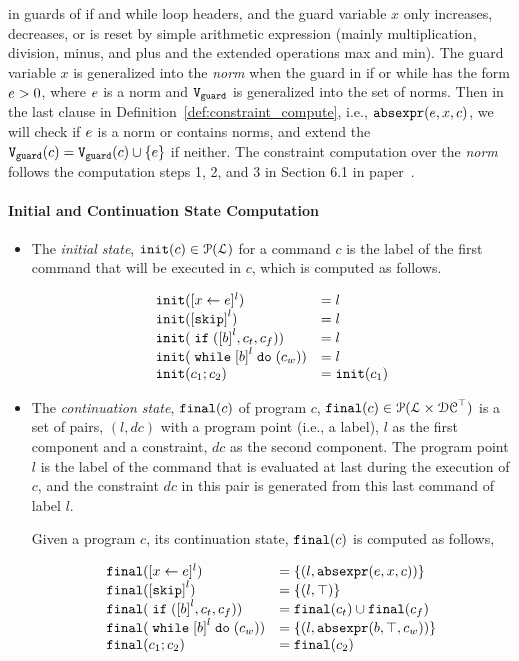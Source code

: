 in guards of if and while loop headers, and 
the guard variable $x$ only increases, decreases, or is reset by 
simple arithmetic expression (mainly multiplication, division, minus, and plus and the extended operations max and min). 
The guard variable $x$ is generalized into the \emph{norm} when the guard 
in if or while has the form $e > 0$, where $e$ is a norm and $\mathtt{V}_{\mathtt{guard}}$ is generalized into the set of norms.
Then in the last clause in Definition~\ref{def:constraint_compute}, i.e., $\mathtt{abs}{\mathtt{expr}}(e, x, c)$,
we will check if $e$ is a norm or contains norms, and extend the $\mathtt{V}_{\mathtt{guard}}(c)= \mathtt{V}_{\mathtt{guard}}(c)\cup \{e\}$ if neither.
The constraint computation over the \emph{norm} follows the computation steps 1, 2, and 3 in Section 6.1 in paper~\cite{SinnZV17}. 
%
\paragraph{Initial and Continuation State Computation}
%
\begin{itemize}
 \item The \emph{initial state}, $\mathtt{init}(c) \in \mathcal{P}(\mathcal{L})$
 for a command $c$ is the label of the first command that will be executed in $c$,
 which is computed as follows.

\[
 \begin{array}{ll}
 \absinit(\clabel{\assign{x}{\expr}}{}^l) & = l \\
 \absinit(\clabel{\eskip}^{l}) & = l \\
 \absinit(\eif (\clabel{\bexpr}^l, c_t, c_f)) & = l \\
 \absinit(\ewhile \clabel{\bexpr}^l \edo (c_w)) & = l \\
 \absinit(c_1 ; c_2) & = \absinit(c_1) \\
 \end{array}
 \]
%
%
\item The \emph{continuation state}, $\mathtt{final}(c)$ of program $c$, 
$\mathtt{final}(c) \in \mathcal{P}(\mathcal{L} \times \mathcal{DC}^{\top})$
is a set of pairs, $(l, dc)$ with a
program point (i.e., a label), $l$ as the first component and a constraint, 
$dc$ as the second component.
The program point $l$ is the label of the command that is evaluated at last during the execution of $c$,
and the constraint $dc$ in this pair is generated from this last command of label $l$.

Given a program $c$, its continuation state, $\mathtt{final}(c)$ is computed as follows,

\[
 \begin{array}{ll}
 \absfinal(\clabel{\assign{x}{\expr}}{}^l) & = \{(l, \absexpr(\expr, x, c))\} \\
 \absfinal(\clabel{\eskip}^{l}) 
 & = \{(l, \top)\} \\
 \absfinal(\eif (\clabel{\bexpr}^l, c_t, c_f)) & = \absfinal(c_t) \cup \absfinal(c_f) \\
 \absfinal(\ewhile \clabel{\bexpr}^l \edo (c_w)) & = \{(l, \absexpr(\bexpr, \top, c_w))\} \\
 \absfinal(c_1 ; c_2) & = \absfinal(c_2) \\
 \end{array}
 \]
\end{itemize}
